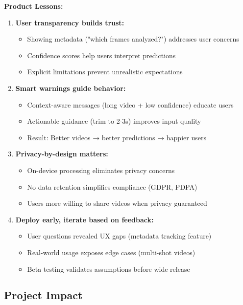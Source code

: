 \documentclass[11pt,a4paper]{article}
\begin{document}
\textbf{Product Lessons:}

\begin{enumerate}
\item \textbf{User transparency builds trust:}
   \begin{itemize}
   \item Showing metadata ("which frames analyzed?") addresses user concerns
   \item Confidence scores help users interpret predictions
   \item Explicit limitations prevent unrealistic expectations
   \end{itemize}

\item \textbf{Smart warnings guide behavior:}
   \begin{itemize}
   \item Context-aware messages (long video + low confidence) educate users
   \item Actionable guidance (trim to 2-3s) improves input quality
   \item Result: Better videos → better predictions → happier users
   \end{itemize}

\item \textbf{Privacy-by-design matters:}
   \begin{itemize}
   \item On-device processing eliminates privacy concerns
   \item No data retention simplifies compliance (GDPR, PDPA)
   \item Users more willing to share videos when privacy guaranteed
   \end{itemize}

\item \textbf{Deploy early, iterate based on feedback:}
   \begin{itemize}
   \item User questions revealed UX gaps (metadata tracking feature)
   \item Real-world usage exposes edge cases (multi-shot videos)
   \item Beta testing validates assumptions before wide release
   \end{itemize}
\end{enumerate}

\subsection{Project Impact}
\end{document}
